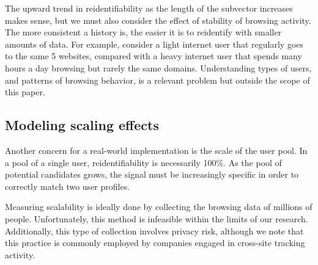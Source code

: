 \documentclass[letterpaper,twocolumn,10pt]{article}
\begin{document}
The upward trend in reidentifiability as the length of the subvector increases makes sense, but we must also consider the effect of stability of browsing activity. The more consistent a history is, the easier it is to reidentify with smaller amounts of data. For example, consider a light internet user that regularly goes to the same 5 websites, compared with a heavy internet user that spends many hours a day browsing but rarely the same domains.
Understanding types of users, and patterns of browsing behavior, is a relevant problem but outside the scope of this paper.
%
\subsection{Modeling scaling effects}
\label{ssec:ext-scalability}
%
Another concern for a real-world implementation is the scale of the user pool. 
In a pool of a single user, reidentifiability is necessarily 100\%.
As the pool of potential candidates grows, the signal must be increasingly specific in order to correctly match two user profiles.

Measuring scalability is ideally done by collecting the browsing data of millions of people. Unfortunately, this method is infeasible within the limits of our research. 
Additionally, this type of collection involves privacy risk, although we note that this practice is commonly employed by companies engaged in cross-site tracking activity.
\end{document}

